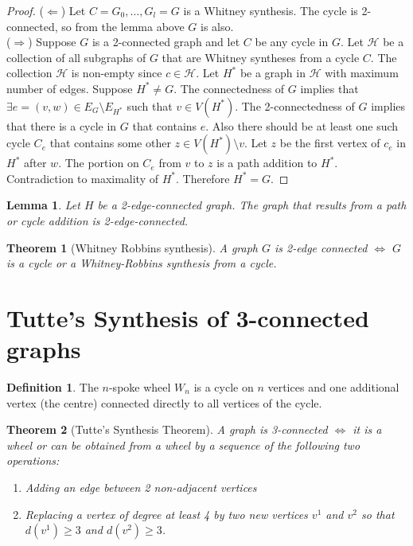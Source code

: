 \documentclass{article}
\newtheorem*{thm}{Theorem}
\newtheorem*{lem}{Lemma}
\theoremstyle{definition}
\newtheorem*{defn}{Definition}
\begin{document}
\begin{proof}
($\Leftarrow$) Let $C=G_0,\ldots,G_l=G$ is a Whitney synthesis.
The cycle is 2-connected, so from the lemma above $G$ is also.\\
($\Rightarrow$) Suppose $G$ is a 2-connected graph and let $C$ be any cycle in $G$.
Let $\mathcal{H}$ be a collection of all subgraphs of $G$ that are Whitney syntheses from a cycle $C$.
The collection $\mathcal{H}$ is non-empty since $c\in\mathcal{H}$.
Let $H^*$ be a graph in $\mathcal{H}$ with maximum number of edges.
Suppose $H^*\ne G$.
The connectedness of $G$ implies that $\exists e=(v,w)\in E_G\setminus E_{H^*}$ such that $v\in V(H^*)$.
The 2-connectedness of $G$ implies that there is a cycle in $G$ that contains $e$.
Also there should be at least one such cycle $C_e$ that contains some other $z\in V(H^*)\setminus v$.
Let $z$ be the first vertex of $c_e$ in $H^*$ after $w$.
The portion on $C_e$ from $v$ to $z$ is a path addition to $H^*$.
Contradiction to maximality of $H^*$.
Therefore $H^* = G$.
\end{proof}

\begin{lem}
Let $H$ be a 2-edge-connected graph.
The graph that results from a path or cycle addition is 2-edge-connected.
\end{lem}

\begin{thm}[Whitney Robbins synthesis]
A graph $G$ is 2-edge connected $\iff$ $G$ is a cycle or a Whitney-Robbins synthesis from a cycle.
\end{thm}

\section{Tutte's Synthesis of 3-connected graphs}
\begin{defn}
The $n$-spoke wheel $W_n$ is a cycle on $n$ vertices and one additional vertex (the centre) connected directly to all vertices of the cycle.
\end{defn}

\begin{thm}[Tutte's Synthesis Theorem]
A graph is 3-connected $\iff$ it is a wheel or can be obtained from a wheel by a sequence of the following two operations:
\begin{enumerate}
\item Adding an edge between 2 non-adjacent vertices
\item Replacing a vertex of degree at least 4 by two new vertices $v^1$ and $v^2$ so that $d(v^1) \ge 3$ and $d(v^2)\ge 3$.
\end{enumerate}
\end{thm}
\end{document}
